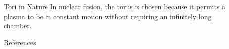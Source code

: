 \documentclass{beamer}
\newlength{\sepwidth}
\newlength{\colwidth}
\newcommand{\separatorcolumn}{\begin{column}{\sepwidth}\end{column}}
\begin{document}
\begin{frame}[t]
\begin{columns}[t]
\begin{column}{\colwidth}
\begin{block}{Tori in Nature}
In nuclear fusion, the torus is chosen because it permits a plasma to be in constant motion without requiring an infinitely long chamber.
\bigskip


\end{block}
\begin{block}{References}
\nocite{morris1989topology, ding_author_2024}
\printbibliography

\end{block}
\end{column}
\separatorcolumn\separatorcolumn%

\end{columns}
\end{frame}
\end{document}
